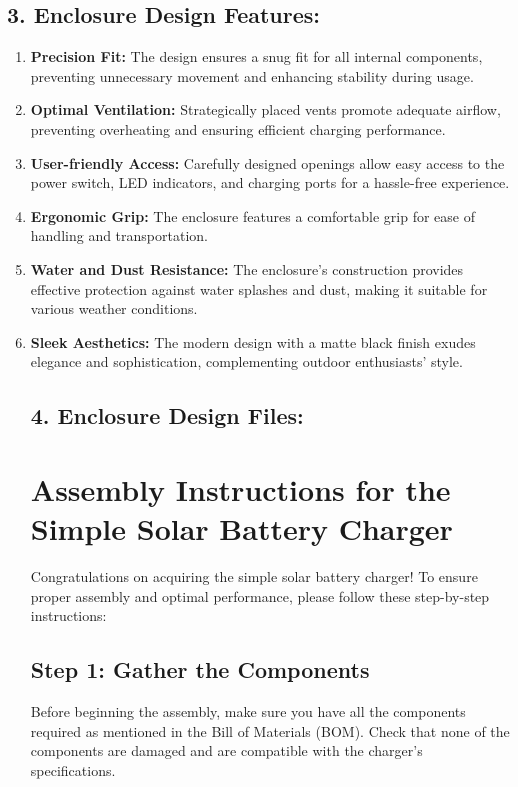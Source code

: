 \documentclass[twocolumn]{article}
\begin{document}
\subsection*{3. Enclosure Design Features:}

\begin{enumerate}
    \item \textbf{Precision Fit:} The design ensures a snug fit for all internal components, preventing unnecessary movement and enhancing stability during usage.

    \item \textbf{Optimal Ventilation:} Strategically placed vents promote adequate airflow, preventing overheating and ensuring efficient charging performance.

    \item \textbf{User-friendly Access:} Carefully designed openings allow easy access to the power switch, LED indicators, and charging ports for a hassle-free experience.

    \item \textbf{Ergonomic Grip:} The enclosure features a comfortable grip for ease of handling and transportation.

    \item \textbf{Water and Dust Resistance:} The enclosure's construction provides effective protection against water splashes and dust, making it suitable for various weather conditions.

    \item \textbf{Sleek Aesthetics:} The modern design with a matte black finish exudes elegance and sophistication, complementing outdoor enthusiasts' style.

\subsection*{4. Enclosure Design Files:}

\section*{Assembly Instructions for the Simple Solar Battery Charger}

Congratulations on acquiring the simple solar battery charger! To ensure proper assembly and optimal performance, please follow these step-by-step instructions:

\subsection*{Step 1: Gather the Components}
Before beginning the assembly, make sure you have all the components required as mentioned in the Bill of Materials (BOM). Check that none of the components are damaged and are compatible with the charger's specifications.


\end{enumerate}
\end{document}
